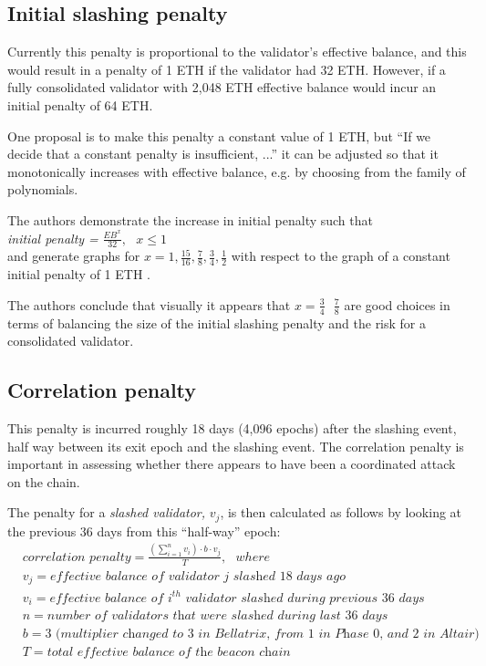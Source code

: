 \documentclass{article}
\begin{document}
\subsection{Initial slashing penalty}
Currently this penalty is proportional to the validator's effective balance,
and this would result in a penalty of 1 ETH if the validator had 32 ETH.
However, if a fully consolidated validator with 2,048 ETH effective balance
would incur an initial penalty of 64 ETH.

One proposal is to make this penalty a constant value of 1 ETH, but ``If we
decide that a constant penalty is insufficient, ...'' it can be adjusted so
that it monotonically increases with effective balance, e.g. by choosing from
the family of polynomials.


The authors demonstrate the increase in initial penalty such that \\
\textit{initial penalty =} $\frac{EB^x}{32}, \texttt{ } x \leqslant 1$ \\

and generate graphs for $x=1, \frac{15}{16}, \frac{7}{8}, \frac{3}{4},
\frac{1}{2}$ with respect to the graph of a constant initial penalty of 1 ETH
\cite{Neuder2023d}.

The authors conclude that visually it appears that $x = \frac{3}{4} \texttt{ }
\frac{7}{8}$ are good choices in terms of balancing the size of the initial
slashing penalty and the risk for a consolidated validator.

\subsection{Correlation penalty}
This penalty is incurred roughly 18 days (4,096 epochs) after the slashing
event, half way between its exit epoch and the slashing event. The correlation
penalty is important in assessing whether there appears to have been a
coordinated attack on the chain.

The penalty for a \textit{slashed validator,} $ v_j$, is then calculated as
follows by looking at the previous 36 days from this ``half-way'' epoch:
\begin{equation*}
  \begin{split}
& \textit{correlation penalty} = \frac{\left( \sum_{i=1}^n v_i  \right) \cdot  b \cdot  v_j}{T}, \texttt{ } where \\
& v_j = \textit{effective balance of validator j slashed 18 days ago} \\
& v_i = \textit{effective balance of } i^{th} \textit{ validator slashed during previous 36 days} \\
& n = \textit{number of validators that were slashed during last 36 days} \\
& b =3 \textit{ (multiplier changed to 3 in Bellatrix, from 1  in Phase 0, and 2 in Altair)} \\
& T = \textit{total effective balance of the beacon chain}
  \end{split}
\end{equation*}
\end{document}
